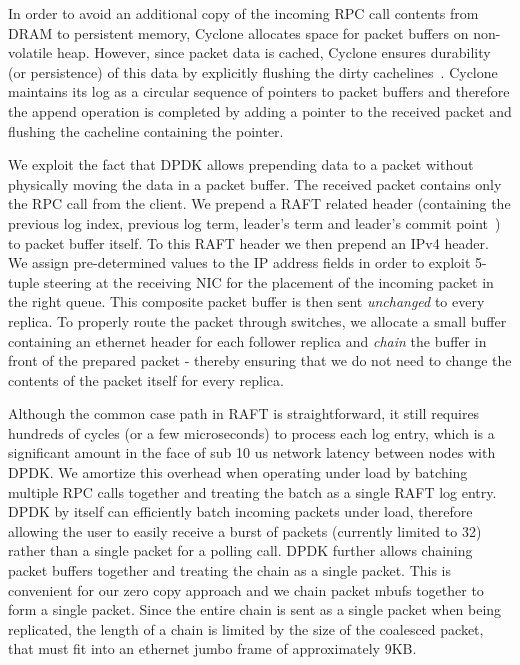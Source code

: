 \documentclass[letterpaper,twocolumn,10pt]{article}
\begin{document}
In order to avoid an additional copy of the incoming RPC call contents from DRAM
to persistent memory, Cyclone allocates space for packet buffers on non-volatile
heap. However, since packet data is cached, Cyclone ensures durability
(or persistence) of this data by explicitly flushing the dirty
cachelines~\cite{pmfs}. Cyclone maintains its log as a circular sequence of
pointers to packet buffers and therefore the append operation is completed by
adding a pointer to the received packet and flushing the cacheline containing
the pointer.

We exploit the fact that DPDK allows prepending data to a packet
without physically moving the data in a packet buffer. The received packet
contains only the RPC call from the client. We prepend a RAFT related header
(containing the previous log index, previous log term, leader's term and
leader's commit point~\cite{raft}) to packet buffer itself. To this RAFT header 
we then prepend an IPv4 header. We assign pre-determined values to the
IP address fields in order to exploit 5-tuple steering at the receiving NIC for 
the placement of the incoming packet in the right queue.
This composite packet buffer is then sent \emph{unchanged} to every replica.
To properly route the packet through switches, we allocate a small buffer
containing an ethernet header for each follower replica and \emph{chain} the
buffer in front of the prepared packet - thereby ensuring that we do not need
to change the contents of the packet itself for every replica.

Although the common case path in RAFT is straightforward, it still requires
hundreds of cycles (or a few microseconds) to process each log entry, which is
a significant amount in the face of sub 10 us network latency between nodes with
DPDK. We amortize this overhead when operating under load by
batching multiple RPC calls together and treating the batch as a single RAFT log
entry.  DPDK by itself can efficiently batch incoming packets under load,
therefore allowing the user to easily receive a burst of packets
(currently limited to 32) rather than a single packet for a polling call.
DPDK further allows chaining packet
buffers together and treating the chain as a single packet. This is convenient
for our zero copy approach and we chain packet mbufs together to form a single
packet. Since the entire chain is sent as a single packet when being replicated,
the length of a chain is limited by the size of the coalesced packet, that must
fit into an ethernet jumbo frame of approximately 9KB.
\end{document}

